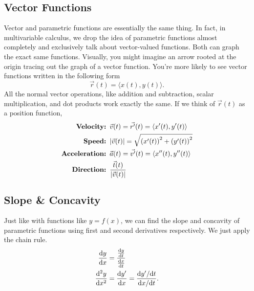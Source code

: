 \subsection{Vector Functions}
Vector and parametric functions are essentially the same thing.
In fact, in multivariable calculus, we drop the idea of parametric functions almost completely and exclusively talk about vector-valued functions.
Both can graph the exact same functions.
Visually, you might imagine an arrow rooted at the origin tracing out the graph of a vector function. 
You're more likely to see vector functions written in the following form
\begin{equation*}
	\vec{r}(t) = \langle x(t), y(t) \rangle.
\end{equation*}
\noindent
All the normal vector operations, like addition and subtraction, scalar multiplication, and dot products work exactly the same.
If we think of $\vec{r}(t)$ as a position function,
\begin{align*}
	\textbf{Velocity: }& \vec{v}(t) = \vec{r^\prime}(t) = \langle x^\prime(t), y^\prime(t) \rangle \\
	\textbf{Speed: }& \lvert \vec{v}(t) \rvert = \sqrt{\left(x^\prime(t)\right)^2 + \left(y^\prime(t)\right)^2} \\
	\textbf{Acceleration: }& \vec{a}(t) = \vec{v^\prime}(t) = \langle x^{\prime\prime}(t), y^{\prime\prime}(t) \rangle \\
	\textbf{Direction: }& \frac{\vec{t}(t)}{\lvert \vec{v}(t) \rvert} \\
\end{align*}

\subsection{Slope \& Concavity}
Just like with functions like $y=f(x)$, we can find the slope and concavity of parametric functions using first and second derivatives respectively.
We just apply the chain rule.
\begin{align*}
	\frac{\mathrm{d} y}{\mathrm{d} x} &= \frac{\frac{\mathrm{d} y}{\mathrm{d} t}}{\frac{\mathrm{d} x}{\mathrm{d} t}} \\
	\frac{\mathrm{d} ^2y}{\mathrm{d} x^2} &= \frac{\mathrm{d} y^\prime}{\mathrm{d} x} = \frac{\mathrm{d} y^\prime/\mathrm{d} t}{\mathrm{d} x/\mathrm{d} t}.
\end{align*}

